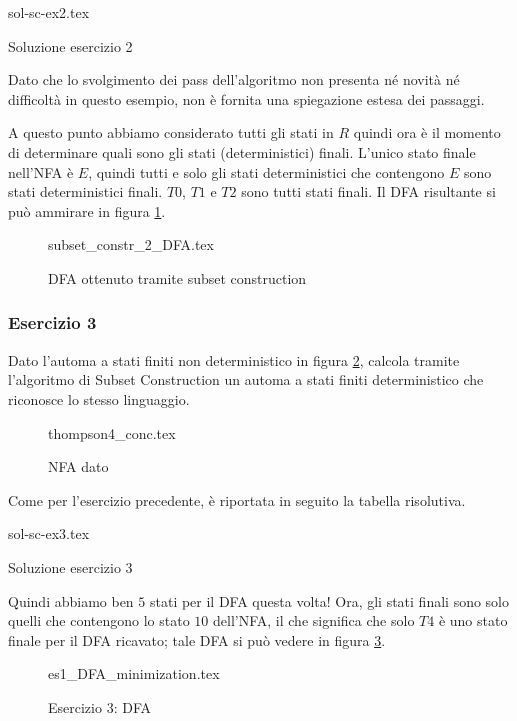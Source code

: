 \documentclass[class=book, crop=false, oneside, 12pt]{standalone}
\begin{document}
\begin{table}[H]
	\centering
	{sol-sc-ex2.tex}
    \caption{Soluzione esercizio 2}
    \label{sol-sc-ex2}
\end{table} 

Dato che lo svolgimento dei pass dell'algoritmo non presenta né novità né difficoltà in questo esempio, non è fornita una spiegazione estesa dei passaggi.

A questo punto abbiamo considerato tutti gli stati in \(R\) quindi ora è il momento di determinare quali sono gli stati (deterministici) finali. L’unico stato finale nell'NFA è \(E\), quindi tutti e solo gli stati deterministici che contengono \(E\) sono stati deterministici finali. \(T0\), \(T1\) e \(T2\) sono tutti stati finali. Il DFA risultante si può ammirare in figura \ref{sol_sc_2}.
\begin{figure}[H]
    \centering
    {subset_constr_2_DFA.tex}
    \caption{DFA ottenuto tramite subset construction}
    \label{sol_sc_2}
\end{figure}

\subsubsection*{Esercizio 3}
Dato l'automa a stati finiti non deterministico in figura \ref{es_sc_3}, calcola tramite l'algoritmo di Subset Construction un automa a stati finiti deterministico che riconosce lo stesso linguaggio.
\begin{figure}[H]
    \centering
    {thompson4_conc.tex}
    \caption{NFA dato}
    \label{es_sc_3}
\end{figure}
Come per l'esercizio precedente, è riportata in seguito la tabella risolutiva.\\

\begin{table}[H]
	\centering
	{sol-sc-ex3.tex}
    \caption{Soluzione esercizio 3}
    \label{sol-sc-ex3}
\end{table}

Quindi abbiamo ben \(5\) stati per il DFA questa volta! Ora, gli stati finali sono solo quelli che contengono lo stato \(10\) dell'NFA, il che significa che solo \(T4\) è uno stato finale per il DFA ricavato; tale DFA si può vedere in figura \ref{sol_sc_3}.
\begin{figure}[H]
    \centering
    {es1_DFA_minimization.tex}
    \caption{Esercizio 3: DFA}
    \label{sol_sc_3}
\end{figure}
\end{document}
